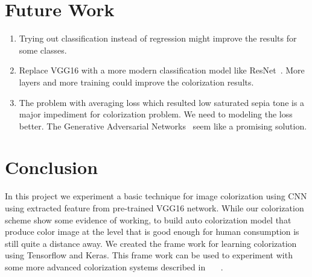 \documentclass[12pt]{article}
\begin{document}
\section{Future Work}
\begin{enumerate}
	\item Trying out classification instead of regression might improve the results for some classes.
	\item Replace VGG16 with a more modern classification model like ResNet~\cite{ResNet}. More layers and more training could improve the colorization results. 
\item  The problem with averaging loss which resulted low saturated sepia tone is a major impediment for colorization problem. We need to modeling the loss better. The Generative Adversarial Networks~\cite{GAN} seem like a promising solution. 
\end{enumerate}


\section{Conclusion}
In this project we experiment a basic technique for image colorization using CNN using extracted feature from pre-trained VGG16 network. While our colorization scheme show some evidence of working, to build auto colorization model that produce color image at the level that is good enough for human consumption is still quite a distance away. We created the frame work for learning colorization using Tensorflow and Keras. This frame work can be used to experiment with some more advanced colorization systems described in  ~\cite{Zhang}~\cite{Iizuka}~\cite{Guillaume}.



\end{document}
